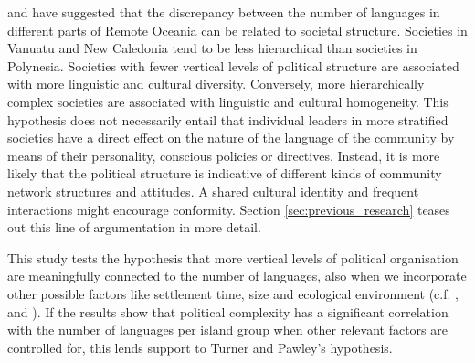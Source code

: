 \documentclass[12pt,letterpaper]{article}
\begin{document}
\citet{turner1884} and \citet{pawley81,pawley2007} have suggested that the discrepancy between the number of languages in different parts of Remote Oceania can be related to societal structure. Societies in Vanuatu and New Caledonia tend to be less hierarchical than societies in Polynesia. Societies with fewer vertical levels of political structure are associated with more linguistic and cultural diversity. Conversely, more hierarchically complex societies are associated with linguistic and cultural homogeneity. This hypothesis does not necessarily entail that individual leaders in more stratified societies have a direct effect on the nature of the language of the community by means of their personality, conscious policies or directives. Instead, it is more likely that the political structure is indicative of different kinds of community network structures and attitudes. A shared cultural identity and frequent interactions might encourage conformity. Section \ref{sec:previous_research} teases out this line of argumentation in more detail.


This study tests the hypothesis that more vertical levels of political organisation are meaningfully connected to the number of languages, also when we incorporate other possible factors like settlement time, size and ecological environment (c.f. \citet{NETTLE1998}, \citet{gavin2012island} and \citet{hua2019ecological}). If the results show that political complexity has a significant correlation with the number of languages per island group when other relevant factors are controlled for, this lends support to Turner and Pawley's hypothesis.
 
\end{document}
